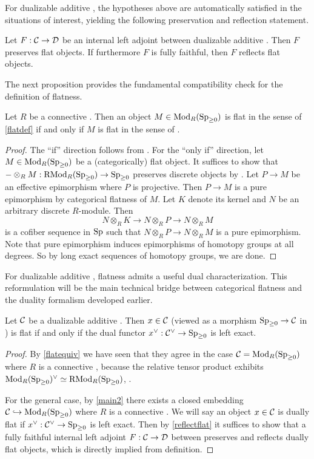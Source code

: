 \documentclass[a4paper,10pt, oneside]{amsart}
\begin{document}
	For dualizable additive \infcats, the hypotheses above are automatically satisfied in the situations of interest, yielding the following preservation and reflection statement.
	\begin{cor}\label{reflectflat}
		Let $F:\mathcal{C}\to\mathcal{D}$ be an internal left adjoint between dualizable additive \infcats. Then $F$ preserves flat objects. If furthermore $F$ is fully faithful, then $F$ reflects flat objects.
	\end{cor}
	

	
	The next proposition provides the fundamental compatibility check for the definition of flatness.
	\begin{prop}\label{flatequiv}
		Let $R$ be a connective \eonering. Then an object $M\in\operatorname{Mod}_{R}(\operatorname{Sp}_{\geq0})$ is flat in the sense of \cref{flatdef} if and only if $M$ is flat in the sense of \cite[Definition 7.2.2.10]{ha}.
	\end{prop}
	\begin{proof}
		The ``if'' direction follows from \cite[Lazard's Theorem 7.2.2.15(2)]{ha}. For the
		 ``only if'' direction, let $M\in\operatorname{Mod}_{R}(\operatorname{Sp}_{\geq0})$ be a (categorically) flat object.
		  It suffices to show that $-\otimes_RM: \operatorname{RMod}_{R}(\operatorname{Sp}_{\geq0})\to \operatorname{Sp}_{\geq0}$ preserves discrete 
		  objects by \cite[Theorem 7.2.2.15(5)]{ha}. Let $P\to M$ be an effective epimorphism 
		  where $P$ is projective. Then $P\to M$ is a pure epimorphism by categorical flatness 
		  of $M$. Let $K$ denote its kernel and $N$ be an arbitrary discrete $R$-module. Then 
		  $$N\otimes_RK\to N\otimes_RP\to N\otimes_RM$$ is a cofiber sequence in $\mathrm{Sp}$ such 
		  that $N\otimes_RP\to N\otimes_RM$ is a pure epimorphism. Note that pure epimorphism 
		  induces epimorphisms of homotopy groups at all degrees. So by long exact sequences of homotopy groups, we are done.
	\end{proof}
	For dualizable additive \infcats, flatness admits a useful dual characterization. This reformulation will be the main technical bridge between categorical flatness and the duality formalism developed earlier.
	\begin{prop}
		Let $\mathcal{C}$ be a dualizable additive \infcat. Then $x\in\mathcal{C}$ (viewed as a morphism $\operatorname{Sp}_{\geq0}\to\mathcal{C}$ in \prlad ) is flat if and only if the dual functor $x^\vee:\mathcal{C}^\vee\to \operatorname{Sp}_{\geq0}$ is left exact.
	\end{prop}
	\begin{proof}
		By \cref{flatequiv} we have seen that they agree in the case $\mathcal{C}=\operatorname{Mod}_{R}(\operatorname{Sp}_{\geq0})$ where $R$ is a connective \eonering, because the relative tensor product exhibits $\operatorname{Mod}_{R}(\operatorname{Sp}_{\geq0})^\vee \simeq \operatorname{RMod}_{R}(\operatorname{Sp}_{\geq0})$, \cite[see][Remark 4.8.4.8]{ha}.
		
		For the general case,  by \cref{main2} there exists a closed embedding $\mathcal{C}\hookrightarrow \operatorname{Mod}_{R}(\operatorname{Sp}_{\geq0})$ where $R$ is a connective \eonering. We will say an object $x\in \mathcal{C}$ is dually flat if $x^\vee:\mathcal{C}^\vee\to \operatorname{Sp}_{\geq0}$ is left exact. Then by \cref{reflectflat} it suffices to show that a fully faithful internal left adjoint $F:\mathcal{C}\to\mathcal{D}$ between \dualaddinfcats preserves and reflects dually flat objects, which is directly implied from definition.
	\end{proof}
\end{document}
